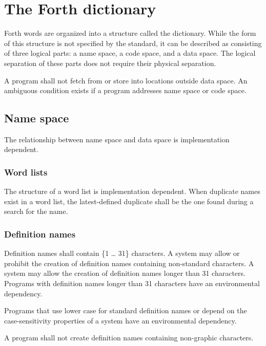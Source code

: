 \section{The Forth dictionary} %
\label{usage:dict}

Forth words are organized into a structure called the dictionary.
While the form of this structure is not specified by the standard,
it can be described as consisting of three logical parts:
a name space, a code space, and a data space. The logical separation
of these parts does not require their physical separation.

A program shall not fetch from or store into locations outside data
space. An ambiguous condition exists if a program addresses name
space or code space.

\subsection{Name space} %

The relationship between name space and data space is implementation
dependent.

\subsubsection{Word lists} %

The structure of a word list is implementation dependent. When
duplicate names exist in a word list, the latest-defined duplicate
shall be the one found during a search for the name.

\subsubsection{Definition names} %
\label{usage:names}

Definition names shall contain \{1 {\ldots} 31\} characters.
A system may allow or prohibit the creation of definition names
containing non-standard characters.  A system may allow the creation
of definition names longer than 31 characters.  Programs with
definition names longer than 31 characters have an environmental
dependency.

Programs that use lower case for standard definition names or depend
on the case-sensitivity properties of a system have an environmental
dependency.

A program shall not create definition names containing non-graphic
characters.

